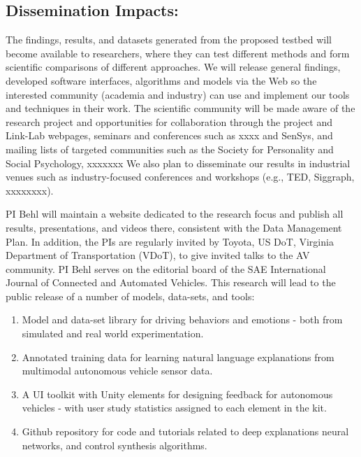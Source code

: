 \subsection{Dissemination Impacts:}
The findings, results, and datasets generated from the proposed testbed will become available to researchers, where they can test different methods and form scientific comparisons of different approaches. We will release general findings, developed software interfaces, algorithms and models via the Web so the interested community (academia and industry) can use and implement our tools and techniques in their work. The scientific community will be made aware of the research project and opportunities for collaboration through the project and Link-Lab webpages, seminars and conferences such as xxxx and SenSys, and mailing lists of targeted communities such as the Society for Personality and Social Psychology, xxxxxxx %
We also plan to disseminate our results in industrial venues such as industry-focused conferences and workshops (e.g., TED, Siggraph, xxxxxxxx).



PI Behl will maintain a website dedicated to the research focus and publish all results, presentations, and videos there, consistent with the Data Management Plan. 
In addition, the PIs are regularly invited by Toyota, US DoT, Virginia Department of Transportation (VDoT), to give invited talks to the AV community.
PI Behl serves on the editorial board of the SAE International Journal of Connected and Automated Vehicles.
This research will lead to the public release of a number of models, data-sets, and tools:
\begin{enumerate}[itemsep=0pt,parsep=0pt,topsep=4pt,leftmargin=0.4in]
    \item Model and data-set library for driving behaviors and emotions - both from simulated and real world experimentation. 
    \item Annotated training data for learning natural language explanations from multimodal autonomous vehicle sensor data.
    \item A UI toolkit with Unity elements for designing feedback for autonomous vehicles - with user study statistics assigned to each element in the kit.
    \item Github repository for code and tutorials related to deep explanations neural networks, and control synthesis algorithms. 
\end{enumerate}